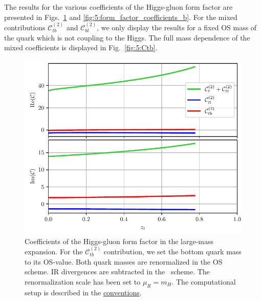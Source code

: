 The results for the various coefficients of the Higgs-gluon form factor are presented in Figs.~\ref{fig:5:form_factor_coefficients_t} and \ref{fig:5:form_factor_coefficients_b}. For the mixed contributions $\mathcal{C}^{(2)}_{tb}$ and $\mathcal{C}^{(2)}_{bt}$, we only display the results for a fixed \acs{OS} mass of the quark which is not coupling to the Higgs. The full mass dependence of the mixed coefficients is displayed in Fig.~\ref{fig:5:Ctb}.
\begin{figure}[ht]
\centering
\includegraphics[width=\figurewidth]{Images/form_factor_coefficients_t.pdf}
\caption{Coefficients of the Higgs-gluon form factor in the large-mass expansion. For the $\mathcal{C}_{tb}^{(2)}$ contribution, we set the bottom quark mass to its \acs{OS}-value. Both quark masses are renormalized in the \acs{OS} scheme. \acs{IR} divergences are subtracted in the \MS\ scheme. The renormalization scale has been set to $\mu_R = m_H$. The computational setup is described in the \hyperref[chap:notation_and_conventions]{conventions}.}
\label{fig:5:form_factor_coefficients_t}
\end{figure}
